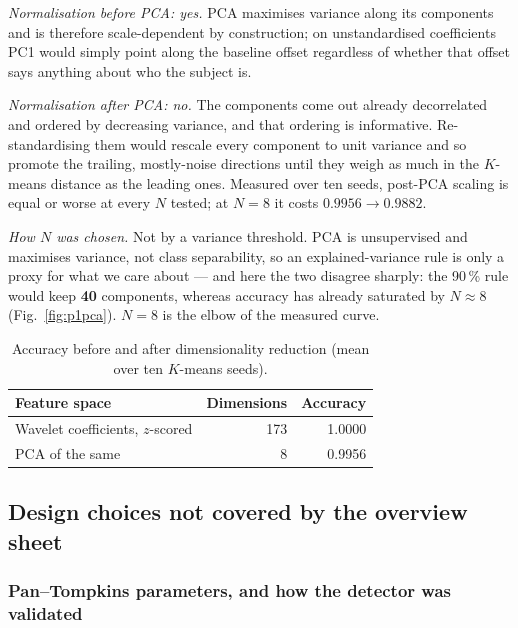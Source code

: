 \documentclass[11pt,a4paper]{article}
\newcommand{\percent}{\%}
\newcommand{\num}[1]{#1}
\newcommand{\SI}[2]{#1\,#2}
\begin{document}
\emph{Normalisation before PCA: yes.} PCA maximises variance along its components and is
therefore scale-dependent by construction; on unstandardised coefficients PC1 would simply
point along the baseline offset regardless of whether that offset says anything about who the
subject is.

\emph{Normalisation after PCA: no.} The components come out already decorrelated and ordered
by decreasing variance, and that ordering is informative. Re-standardising them would rescale
every component to unit variance and so promote the trailing, mostly-noise directions until
they weigh as much in the $K$-means distance as the leading ones. Measured over ten seeds,
post-PCA scaling is equal or worse at every $N$ tested; at $N=8$ it costs
$0.9956 \rightarrow 0.9882$.

\emph{How $N$ was chosen.} Not by a variance threshold. PCA is unsupervised and maximises
variance, not class separability, so an explained-variance rule is only a proxy for what we
care about --- and here the two disagree sharply: the \SI{90}{\percent} rule would keep
\textbf{\num{40}} components, whereas accuracy has already saturated by $N\approx 8$
(Fig.~\ref{fig:p1pca}). $N=8$ is the elbow of the measured curve.

\begin{table}[htbp]
\centering\small
\caption{Accuracy before and after dimensionality reduction (mean over ten $K$-means seeds).}
\label{tab:p1dr}
\begin{tabular}{lrr}
\toprule
Feature space & Dimensions & Accuracy \\
\midrule
Wavelet coefficients, $z$-scored & 173 & 1.0000 \\
PCA of the same                  &   8 & 0.9956 \\
\bottomrule
\end{tabular}
\end{table}

\subsection{Design choices not covered by the overview sheet}

\subsubsection{Pan--Tompkins parameters, and how the detector was validated}
\end{document}
